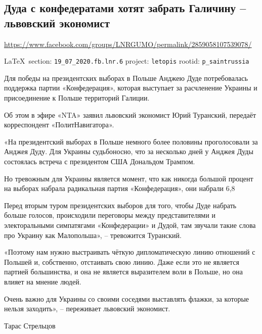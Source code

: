  
 
\subsection{Дуда с конфедератами хотят забрать Галичину – львовский экономист}
\url{https://www.facebook.com/groups/LNRGUMO/permalink/2859058107539078/}
  
\vspace{0.5cm}
{\small\LaTeX~section: \verb|19_07_2020.fb.lnr.6| project: \verb|letopis| rootid: \verb|p_saintrussia|}
\vspace{0.5cm}
 
Для победы на президентских выборах в Польше Анджею Дуде потребовалась
поддержка партии «Конфедерация», которая выступает за расчленение Украины и
присоединение к Польше территорий Галиции.

Об этом в эфире «NTA» заявил львовский экономист Юрий Туранский, передаёт
корреспондент «ПолитНавигатора».

«На президентский выборах в Польше немного более половины проголосовали за
Анджея Дуду. Для Украины судьбоносно, что за несколько дней у Анджея Дуды
состоялась встреча с президентом США Дональдом Трампом.

Но тревожным для Украины является момент, что как никогда большой процент на
выборах набрала радикальная партия «Конфедерация», они набрали 6,8%

Перед вторым туром президентских выборов для того, чтобы Дуде набрать больше
голосов, происходили переговоры между представителями и электоральными
симпатягами «Конфедерации» и Дудой, там звучали такие слова про Украину как
Малопольша», – тревожится Туранский.

«Поэтому нам нужно выстраивать чёткую дипломатическую линию отношений с Польшей
и, собственно, отстаивать свою линию. Даже если это не является партией
большинства, и она не является выразителем воли в Польше, но она влияет на
мнение людей.

Очень важно для Украины со своими соседями выставлять флажки, за которые нельзя
заходить», – переживает львовский экономист.

Тарас Стрельцов 
